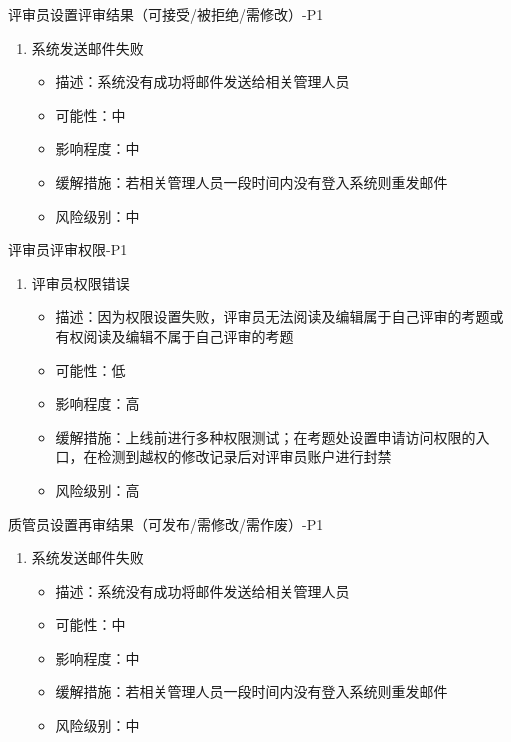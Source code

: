 \documentclass[hyperref, a4paper]{ctexart}
\providecommand{\tightlist}{%
  \setlength{\itemsep}{0pt}\setlength{\parskip}{0pt}}
\begin{document}
评审员设置评审结果（可接受/被拒绝/需修改）-P1

\begin{enumerate}
\def\labelenumi{\arabic{enumi}.}
\tightlist
\item
  系统发送邮件失败

  \begin{itemize}
  \tightlist
  \item
    描述：系统没有成功将邮件发送给相关管理人员
  \item
    可能性：中
  \item
    影响程度：中
  \item
    缓解措施：若相关管理人员一段时间内没有登入系统则重发邮件
  \item
    风险级别：中
  \end{itemize}
\end{enumerate}

评审员评审权限-P1

\begin{enumerate}
\def\labelenumi{\arabic{enumi}.}
\tightlist
\item
  评审员权限错误

  \begin{itemize}
  \tightlist
  \item
    描述：因为权限设置失败，评审员无法阅读及编辑属于自己评审的考题或有权阅读及编辑不属于自己评审的考题
  \item
    可能性：低
  \item
    影响程度：高
  \item
    缓解措施：上线前进行多种权限测试；在考题处设置申请访问权限的入口，在检测到越权的修改记录后对评审员账户进行封禁
  \item
    风险级别：高
  \end{itemize}
\end{enumerate}

质管员设置再审结果（可发布/需修改/需作废）-P1

\begin{enumerate}
\def\labelenumi{\arabic{enumi}.}
\tightlist
\item
  系统发送邮件失败

  \begin{itemize}
  \tightlist
  \item
    描述：系统没有成功将邮件发送给相关管理人员
  \item
    可能性：中
  \item
    影响程度：中
  \item
    缓解措施：若相关管理人员一段时间内没有登入系统则重发邮件
  \item
    风险级别：中
  \end{itemize}
\end{enumerate}
\end{document}
